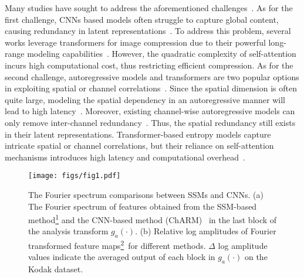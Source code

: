 Many studies have sought to address the aforementioned challenges~\cite{zhou2019end, liu2023learned, he2021checkerboard, minnen2020channel}.
As for the first challenge, CNNs based models often struggle to capture global content, causing redundancy in latent representations~\cite{zhou2019end, cheng2020learned}. 
To address this problem, several works leverage transformers for image compression due to their powerful long-range modeling capabilities~\cite{kenton2019bert, dosovitskiy2020image, liu2021swin, zhu2022transformer, zou2022devil, li2024frequency,chen2021end,liu2023learned}. 
However, the quadratic complexity of self-attention incurs high computational cost, thus restricting efficient compression.
As for the second challenge, autoregressive models and transformers are two popular options in exploiting spatial or channel correlations~\cite{minnen2018joint, qian2021entroformer, he2021checkerboard, minnen2020channel, liu2023learned, li2024frequency, jiang2023mlic, koyuncu2022contextformer}.
Since the spatial dimension is often quite large, modeling the spatial dependency in an autoregressive manner will lead to high latency~\cite{minnen2018joint, qian2021entroformer}.
Moreover, existing channel-wise autoregressive models can only remove inter-channel redundancy~\cite{minnen2020channel, zou2022devil}. 
Thus, the spatial redundancy still exists in their latent representations.
Transformer-based entropy models capture intricate spatial or channel correlations, but their reliance on self-attention mechanisms introduces high latency and computational overhead~\cite{liu2023learned, li2024frequency, jiang2023mlic, koyuncu2022contextformer}.


\IEEEpubidadjcol %


\begin{figure*}[t]
  \centering
   \texttt{[image: figs/fig1.pdf]}
   \vspace{-1em}
   \caption{
   The Fourier spectrum comparisons between SSMs and CNNs.
   (a) The Fourier spectrum of features obtained from the SSM-based method\protect\hyperlink{foot1}{\textsuperscript{1}} and the CNN-based method (ChARM)~\cite{minnen2020channel} in the last block of the analysis transform $g_a(\cdot)$.
   (b) Relative log amplitudes of Fourier transformed feature maps\protect\hyperlink{foot2}{\textsuperscript{2}}~for different methods. 
   $\Delta$ log amplitude values indicate the averaged output of each block in $g_a(\cdot)$ on the Kodak dataset.   
   }
   \vspace{-1em}
   \label{fig1}
\end{figure*}


